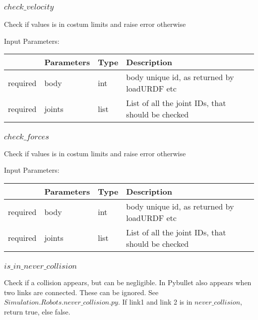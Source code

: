 \documentclass[
	ngerman,
	accentcolor=9c,%
	type=intern,
	marginpar=false
	]{tudapub}
\begin{document}
\subsubsection{$check\_velocity$}
\noindent  Check if values is in costum limits and raise error otherwise

\vspace{0.5cm}
\noindent Input Parameters:
\vspace{0.5cm}

\begin{tabular}{|p{}|p{}|p{}| p{}|}
\hline
 & \textbf{Parameters} & \textbf{Type} & \textbf{Description} \\
\hline
required & body & int & body unique id, as returned by loadURDF etc\\
\hline
required & joints &  list & List of all the joint IDs, that should be checked \\
\hline
\end{tabular}
\vspace{0.5cm}





\subsubsection{$check\_forces$}
\noindent  Check if values is in costum limits and raise error otherwise

\vspace{0.5cm}
\noindent Input Parameters:
\vspace{0.5cm}

\begin{tabular}{|p{}|p{}|p{}| p{}|}
\hline
 & \textbf{Parameters} & \textbf{Type} & \textbf{Description} \\
\hline
required & body & int & body unique id, as returned by loadURDF etc\\
\hline
required & joints &  list & List of all the joint IDs, that should be checked \\
\hline
\end{tabular}
\vspace{0.5cm}





\subsubsection{$is\_in\_never\_collision$}
\noindent Check if a collision appears, but can be negligible. In Pybullet also appears when two links are connected. These can be ignored. See $Simulation.Robots.never\_collision.py$. If link1 and link 2 is in $never\_collision$, return true, else false. 
\end{document}
